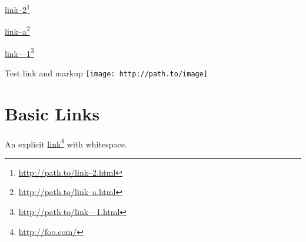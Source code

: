 \href{http://path.to/link--2.html}{link--2}\footnote{\href{http://path.to/link--2.html}{http:/\slash path.to\slash link--2.html}}

\href{http://path.to/link--a.html}{link--a}\footnote{\href{http://path.to/link--a.html}{http:/\slash path.to\slash link--a.html}}

\href{http://path.to/link---1.html}{link---1}\footnote{\href{http://path.to/link---1.html}{http:/\slash path.to\slash link---1.html}}

Test link and markup \texttt{[image: http://path.to/image]}

\part{Basic Links}
\label{basiclinks}

An explicit \href{http://foo.com/}{link}\footnote{\href{http://foo.com/}{http:/\slash foo.com\slash }} with whitespace.




